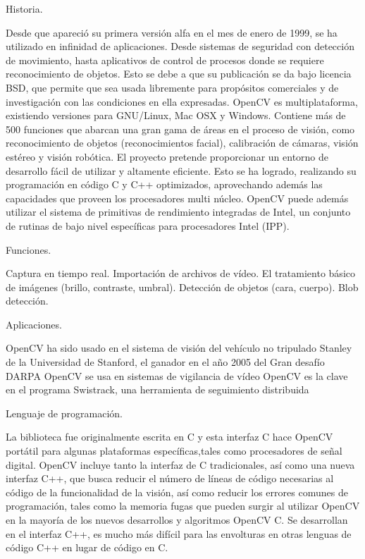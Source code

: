 Historia.

Desde que apareció su primera versión alfa en el mes de enero de 1999, se ha utilizado en infinidad de aplicaciones. Desde sistemas de seguridad con detección de movimiento, hasta aplicativos de control de procesos donde se requiere reconocimiento de objetos. Esto se debe a que su publicación se da bajo licencia BSD, que permite que sea usada libremente para propósitos comerciales y de investigación con las condiciones en ella expresadas.
OpenCV es multiplataforma, existiendo versiones para GNU/Linux, Mac OSX y Windows. Contiene más de 500 funciones que abarcan una gran gama de áreas en el proceso de visión, como reconocimiento de objetos (reconocimientos facial), calibración de cámaras, visión estéreo y visión robótica.
El proyecto pretende proporcionar un entorno de desarrollo fácil de utilizar y altamente eficiente. Esto se ha logrado, realizando su programación en código C y C++ optimizados, aprovechando además las capacidades que proveen los procesadores multi núcleo. OpenCV puede además utilizar el sistema de primitivas de rendimiento integradas de Intel, un conjunto de rutinas de bajo nivel específicas para procesadores Intel (IPP).

Funciones.

Captura en tiempo real.
Importación de archivos de vídeo.
El tratamiento básico de imágenes (brillo, contraste, umbral).
Detección de objetos (cara, cuerpo).
Blob detección.

Aplicaciones.

OpenCV ha sido usado en el sistema de visión del vehículo no tripulado Stanley de la Universidad de Stanford, el ganador en el año 2005 del Gran desafío DARPA
OpenCV se usa en sistemas de vigilancia de vídeo
OpenCV es la clave en el programa Swistrack, una herramienta de seguimiento distribuida

Lenguaje de programación.

La biblioteca fue originalmente escrita en C y esta interfaz C hace OpenCV portátil para algunas plataformas específicas,tales como procesadores de señal digital.
OpenCV incluye tanto la interfaz de C tradicionales, así como una nueva interfaz C++, que busca reducir el número de líneas de código necesarias al código de la funcionalidad de la visión, así como reducir los errores comunes de programación, tales como la memoria fugas que pueden surgir al utilizar OpenCV en la mayoría de los nuevos desarrollos y algoritmos OpenCV C.
Se desarrollan en el interfaz C++, es mucho más difícil para las envolturas en otras lenguas de código C++ en lugar de código en C. \cite{SourceForceWebSite} \cite{UbaaWebSite} \cite{YahooWebSite}